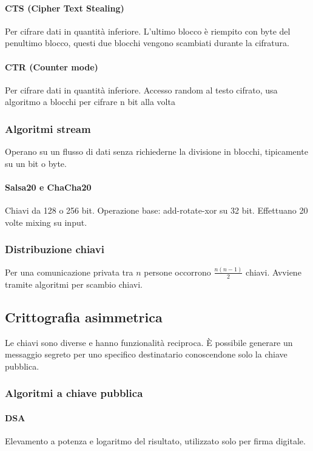 \documentclass[11pt]{article}
\begin{document}
\paragraph*{CTS (Cipher Text Stealing)}
Per cifrare dati in quantità inferiore. L'ultimo blocco è riempito con byte del penultimo blocco, questi due blocchi 
vengono scambiati durante la cifratura.
\paragraph*{CTR (Counter mode)}
Per cifrare dati in quantità inferiore. Accesso random al testo cifrato, usa algoritmo a blocchi per cifrare n bit alla 
volta
\subsubsection{Algoritmi stream}
Operano su un flusso di dati senza richiederne la divisione in blocchi, tipicamente su un bit o byte.
\paragraph*{Salsa20 e ChaCha20}
Chiavi da 128 o 256 bit. Operazione base: add-rotate-xor su 32 bit. Effettuano 20 volte mixing su input.
\subsubsection{Distribuzione chiavi}
Per una comunicazione privata tra $n$ persone occorrono $\frac{n(n-1)}{2}$ chiavi. Avviene tramite algoritmi per scambio
chiavi.
\subsection{Crittografia asimmetrica}
Le chiavi sono diverse e hanno funzionalità reciproca. È possibile generare un messaggio segreto per uno specifico destinatario 
conoscendone solo la chiave pubblica.
\subsubsection{Algoritmi a chiave pubblica}
\paragraph*{DSA}
Elevamento a potenza e logaritmo del risultato, utilizzato solo per firma digitale.
\end{document}
